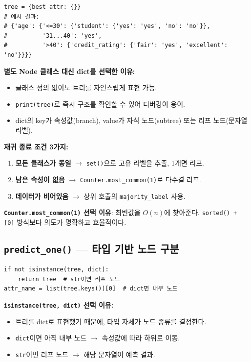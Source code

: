 \documentclass[12pt, a4paper]{article}
\begin{document}
\begin{verbatim}
tree = {best_attr: {}}
# 예시 결과:
# {'age': {'<=30': {'student': {'yes': 'yes', 'no': 'no'}},
#          '31...40': 'yes',
#          '>40': {'credit_rating': {'fair': 'yes', 'excellent': 'no'}}}}
\end{verbatim}

\noindent\textbf{별도 Node 클래스 대신 dict를 선택한 이유:}
\begin{itemize}
    \item 클래스 정의 없이도 트리를 자연스럽게 표현 가능.
    \item \texttt{print(tree)}로 즉시 구조를 확인할 수 있어 디버깅이 용이.
    \item dict의 key가 속성값(branch), value가 자식 노드(subtree) 또는 리프 노드(문자열 라벨).
\end{itemize}

\noindent\textbf{재귀 종료 조건 3가지:}
\begin{enumerate}
    \item \textbf{모든 클래스가 동일} $\to$ \texttt{set()}으로 고유 라벨을 추출, 1개면 리프.
    \item \textbf{남은 속성이 없음} $\to$ \texttt{Counter.most\_common(1)}로 다수결 리프.
    \item \textbf{데이터가 비어있음} $\to$ 상위 호출의 \texttt{majority\_label} 사용.
\end{enumerate}

\noindent\textbf{\texttt{Counter.most\_common(1)} 선택 이유}: 최빈값을 $O(n)$에 찾아준다. \texttt{sorted() + [0]} 방식보다 의도가 명확하고 효율적이다.


\subsection{\texttt{predict\_one()} --- 타입 기반 노드 구분}

\begin{verbatim}
if not isinstance(tree, dict):
    return tree  # str이면 리프 노드
attr_name = list(tree.keys())[0]  # dict면 내부 노드
\end{verbatim}

\noindent\textbf{\texttt{isinstance(tree, dict)} 선택 이유:}
\begin{itemize}
    \item 트리를 dict로 표현했기 때문에, 타입 자체가 노드 종류를 결정한다.
    \item \texttt{dict}이면 아직 내부 노드 $\to$ 속성값에 따라 하위로 이동.
    \item \texttt{str}이면 리프 노드 $\to$ 해당 문자열이 예측 결과.
\end{itemize}
\end{document}
